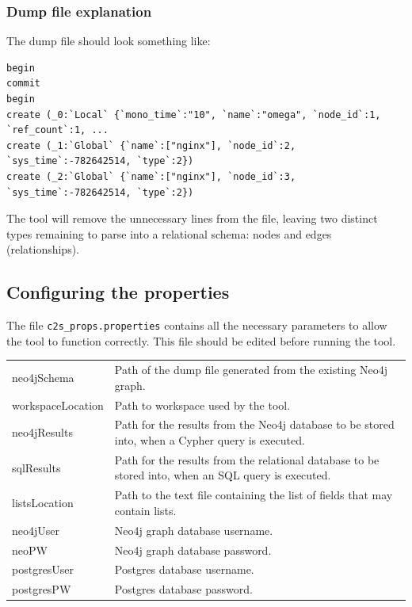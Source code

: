 \documentclass[letterpaper]{ltxdoc}
\begin{document}
\subsubsection{Dump file explanation}
The dump file should look something like:

\begin{verbatim}
begin
commit
begin
create (_0:`Local` {`mono_time`:"10", `name`:"omega", `node_id`:1, `ref_count`:1, ...
create (_1:`Global` {`name`:["nginx"], `node_id`:2, `sys_time`:-782642514, `type`:2})
create (_2:`Global` {`name`:["nginx"], `node_id`:3, `sys_time`:-782642514, `type`:2})
\end{verbatim}

The tool will remove the unnecessary lines from the file, leaving two distinct types remaining to parse into a relational schema: nodes and edges (relationships).


\subsection{Configuring the properties}
\label{ss:prop}
The file \texttt{c2s\_props.properties} contains all the necessary parameters to allow the tool to function correctly. This file should be edited before running the tool.

\begin{center}
\begin{tabular}{ p{3cm} p{10.5cm} }
neo4jSchema & Path of the dump file generated from the existing Neo4j graph. \\
workspaceLocation & Path to workspace used by the tool. \\
neo4jResults & Path for the results from the Neo4j database to be stored into, when a Cypher query is executed. \\
sqlResults & Path for the results from the relational database to be stored into, when an SQL query is executed. \\
listsLocation & Path to the text file containing the list of fields that may contain lists. \\
neo4jUser & Neo4j graph database username. \\
neoPW & Neo4j graph database password. \\
postgresUser & Postgres database username. \\
postgresPW & Postgres database password. \\
\end{tabular}
\end{center}
\end{document}
